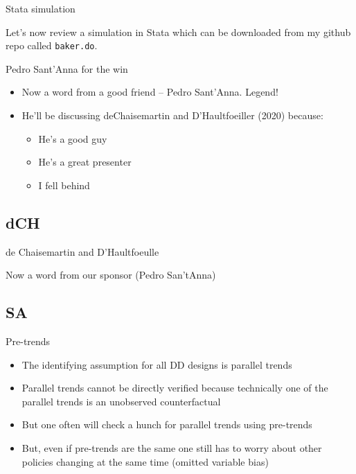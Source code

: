 \documentclass{beamer}
\begin{document}
\begin{frame}{Stata simulation}

Let's now review a simulation in Stata which can be downloaded from my github repo called \texttt{baker.do}.  

\bigskip

\end{frame}


\begin{frame}{Pedro Sant'Anna for the win}

\begin{itemize}
\item Now a word from a good friend -- Pedro Sant'Anna.  Legend!
\item He'll be discussing deChaisemartin and D'Haultfoeiller (2020) because:
	\begin{itemize}
	\item He's a good guy
	\item He's a great presenter
	\item I fell behind
	\end{itemize}
\end{itemize}

\end{frame}

\subsection{dCH}

\begin{frame}{de Chaisemartin and D'Haultfoeulle}

Now a word from our sponsor (Pedro San'tAnna)

\end{frame}

\subsection{SA}


\begin{frame}{Pre-trends}

\begin{itemize}

	\item The identifying assumption for all DD designs is parallel trends
	\item Parallel trends cannot be directly verified because technically one of the parallel trends is an unobserved counterfactual
	\item But one often will check a hunch for parallel trends using pre-trends
	\item But, even if pre-trends are the same one still has to worry about other policies changing at the same time (omitted variable bias)

\end{itemize}

\end{frame}
\end{document}
